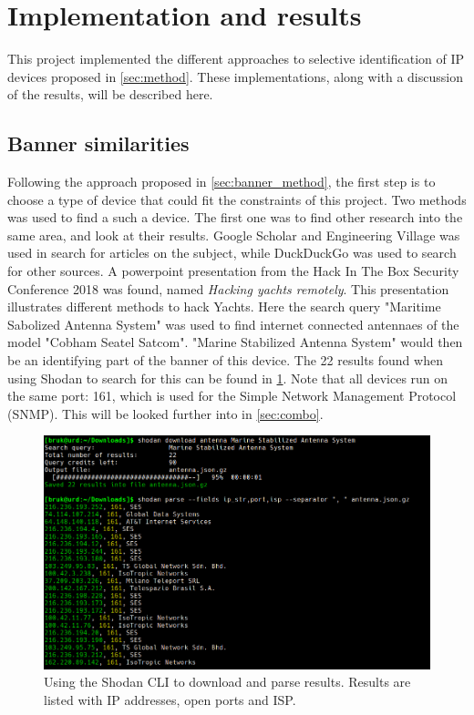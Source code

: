 \section{Implementation and results} \label{sec:results}
This project implemented the different approaches to selective identification of IP devices proposed in \cref{sec:method}. These implementations, along with a discussion of the results, will be described here. 


\subsection{Banner similarities} \label{sec:banner_results}
Following the approach proposed in \cref{sec:banner_method}, the first step is to choose a type of device that could fit the constraints of this project. Two methods was used to find a such a device. The first one was to find other research into the same area, and look at their results. Google Scholar\cite{google_scholar} and Engineering Village\cite{engineering_village} was used in search for articles on the subject, while DuckDuckGo\cite{ddg} was used to search for other sources. A powerpoint presentation from the Hack In The Box Security Conference 2018 was found, named \textit{Hacking yachts remotely}. This presentation illustrates different methods to hack Yachts. Here the search query "Maritime Sabolized Antenna System" was used to find internet connected antennaes of the model "Cobham Seatel Satcom". 
"Marine Stabilized Antenna System" would then be an identifying part of the banner of this device. The 22 results found when using Shodan to search for this can be found in \cref{fig:banner_parsing}. Note that all devices run on the same port: 161, which is used for the Simple Network Management Protocol (SNMP). This will be looked further into in \cref{sec:combo}.

\begin{figure} [H]
    \centering
    \includegraphics[scale=0.4]{Figurer/banner_parsing.png}
    \caption{Using the Shodan CLI to download and parse results. Results are listed with IP addresses, open ports and ISP.}
    \label{fig:banner_parsing}
\end{figure}

